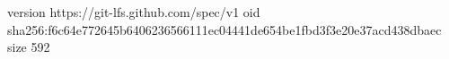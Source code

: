 version https://git-lfs.github.com/spec/v1
oid sha256:f6c64e772645b6406236566111ec04441de654be1fbd3f3e20e37acd438dbaec
size 592
